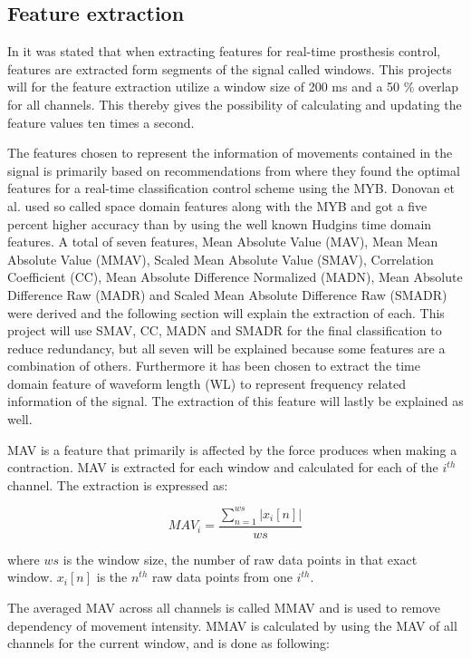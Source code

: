 \subsection{Feature extraction} \label{sub:featExtr}

In  it was stated that when extracting features for real-time prosthesis control, features are extracted form segments of the signal called windows. This projects will for the feature extraction utilize a window size of 200 ms and a 50 \% overlap for all channels. This thereby gives the possibility of calculating and updating the feature values ten times a second.    

The features chosen to represent the information of movements contained in the signal is primarily based on recommendations from \cite{Donovan2017} where they found the optimal features for a real-time classification control scheme using the MYB. Donovan et al. \cite{Donovan2017} used so called space domain features along with the MYB and got a five percent higher accuracy than by using the well known Hudgins time domain features. A total of seven features, Mean Absolute Value (MAV), Mean Mean Absolute Value (MMAV), Scaled Mean Absolute Value (SMAV), Correlation Coefficient (CC), Mean Absolute Difference Normalized (MADN), Mean Absolute Difference Raw (MADR) and Scaled Mean Absolute Difference Raw (SMADR) were derived and the following section will explain the extraction of each. This project will use SMAV, CC, MADN and SMADR for the final classification to reduce redundancy, but all seven will be explained because some features are a combination of others. \cite{Donovan2017} Furthermore it has been chosen to extract the time domain feature of waveform length (WL) to represent frequency related information of the signal. The extraction of this feature will lastly be explained as well. 

MAV is a feature that primarily is affected by the force produces when making a contraction. MAV is extracted for each window and calculated for each of the $i^{th}$ channel. The extraction is expressed as:

\begin{equation} \label{eq:MAV}
MAV_i=\frac{\sum_{n=1}^{ws}|x_i[n]|}{ws}
\end{equation}
  
where $ws$ is the window size, the number of raw data points in that exact window. $x_i[n]$ is the $n^{th}$ raw data points from one $i^{th}$.  

The averaged MAV across all channels is called MMAV and is used to remove dependency of movement intensity. MMAV is calculated by using the MAV of all channels for the current window, and is done as following: 

